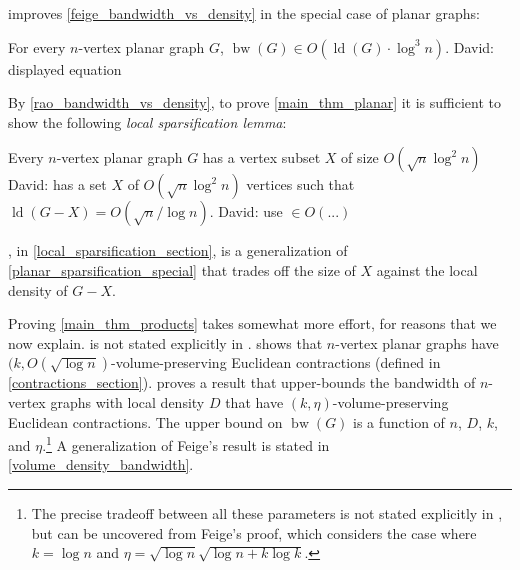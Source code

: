 \documentclass{patmorin}
\newcommand{\david}[1]{{\color{orange} David: #1}}
\newcommand{\defin}[1]{\emph{\textcolor{brightmaroon}{#1}}}
\DeclareMathOperator{\bw}{bw}
\DeclareMathOperator{\ld}{ld}
\begin{document}
\citet{rao:small} improves \cref{feige_bandwidth_vs_density} in the special case of planar graphs:

\begin{thm}
\label{rao_bandwidth_vs_density}
  For every $n$-vertex planar graph $G$, $\bw(G)\in O\left(\ld(G)\cdot \log^3 n\right)$.
  \david{displayed equation}
\end{thm}

By \cref{rao_bandwidth_vs_density}, to prove \cref{main_thm_planar} it is sufficient to show the following \defin{local sparsification lemma}:

\begin{lem}\label{planar_sparsification_special}
  Every $n$-vertex planar graph $G$ has a vertex subset $X$ of size $O(\sqrt{n}\log^2 n)$
  \david{has a set $X$ of $O(\sqrt{n}\log^2 n)$  vertices }
  such that $\ld(G-X)=O(\sqrt{n}/\log n)$.    \david{use $\in O(...)$}
\end{lem}
, in \cref{local_sparsification_section}, is a generalization of \cref{planar_sparsification_special} that trades off the size of $X$ against the local density of $G-X$.

Proving \cref{main_thm_products} takes somewhat more effort, for reasons that we now explain.
 is not stated explicitly in \cite{rao:small}. \citet{rao:small} shows that $n$-vertex planar graphs have $(k,O(\sqrt{\log n})$-volume-preserving Euclidean contractions (defined in \cref{contractions_section}). \citet{feige:approximating} proves a result that upper-bounds the bandwidth of $n$-vertex graphs with local density $D$ that have $(k,\eta)$-volume-preserving Euclidean contractions.  The upper bound on $\bw(G)$ is a function of $n$, $D$, $k$, and $\eta$.\footnote{The precise tradeoff between all these parameters is not stated explicitly in \cite{feige:approximating}, but can be uncovered from Feige's proof, which considers the case where $k=\log n$ and $\eta=\sqrt{\log n}\sqrt{\log n+ k\log k}$.}  A generalization of Feige's result is stated in \cref{volume_density_bandwidth}.
\end{document}
